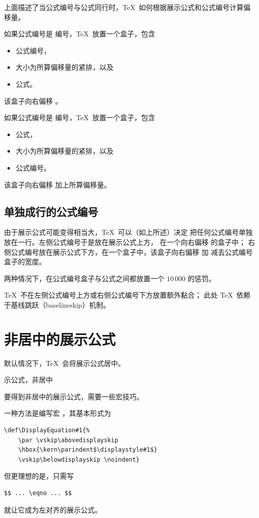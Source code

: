 \documentclass[a4paper]{rapport3}
\def\term#1\par{\index{#1}}
\begin{document}
上面描述了当公式编号与公式同行时，\TeX\ 如何根据展示公式和公式编号计算偏移量。

如果公式编号是  编号，\TeX\ 放置一个盒子，包含
\begin{itemize}\item 公式编号，
\item 大小为所算偏移量的紧排，以及
\item 公式。\end{itemize}
该盒子向右偏移 。

如果公式编号是  编号，\TeX\ 放置一个盒子，包含
\begin{itemize}\item 公式，
\item 大小为所算偏移量的紧排，以及
\item 公式编号。\end{itemize}
该盒子向右偏移  加上所算偏移量。

\subsection{单独成行的公式编号}

由于展示公式可能变得相当大，\TeX\ 可以（如上所述）决定
把任何公式编号单独放在一行。左侧公式编号于是放在展示公式上方，
在一个向右偏移  的盒子中；
右侧公式编号放在展示公式下方，在一个盒子中，该盒子向右偏移
 加  减去公式编号盒子的宽度。

两种情况下，在公式编号盒子与公式之间都放置一个 $10\,000$ 的惩罚。

\TeX\ 不在左侧公式编号上方或右侧公式编号下方放置额外黏合；
此处 \TeX\ 依赖于基线跳跃（baselineskip）机制。


\section{非居中的展示公式}
\label{left:display}

默认情况下，\TeX\ 会将展示公式居中。
\term 展示公式，非居中\par
要得到非居中的展示公式，需要一些宏技巧。

一种方法是编写宏 ，其基本形式为
\begin{verbatim}
\def\DisplayEquation#1{%
    \par \vskip\abovedisplayskip
    \hbox{\kern\parindent$\displaystyle#1$}
    \vskip\belowdisplayskip \noindent}
\end{verbatim}
但更理想的是，只需写
\begin{verbatim}
$$ ... \eqno ... $$
\end{verbatim}
\mdqon
就让它成为左对齐的展示公式。
\mdqoff
\end{document}
